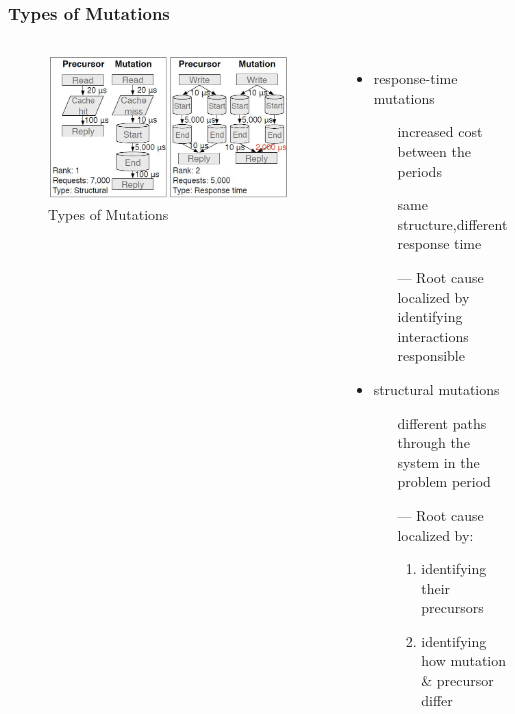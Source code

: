 \documentclass[11pt]{beamer}
\begin{document}
\begin{frame}
\frametitle{Types of Mutations}
\begin{columns}
\begin{figure}[htbp]
\centering
\includegraphics[width=.95\textwidth]{fig/mutation.jpg}
\caption{Types of Mutations}
\label{fig:mutation}
\end{figure}
\begin{itemize}
  \item response-time mutations
  \begin{itemize}
    \item[\ding{43}]increased cost between the periods
    \item[\ding{43}]same structure,different response time
    \vskip5pt
    \item[---] Root cause localized by
    identifying interactions responsible
  \end{itemize}
  \vskip10pt
  \item structural mutations
  \begin{itemize}
    \item[\ding{43}] different paths through the system in the problem period
    \vskip5pt
    \item[---]Root cause localized by:
    \begin{enumerate}
      \item identifying their precursors
      \item identifying how mutation \& precursor differ
    \end{enumerate}
  \end{itemize}
\end{itemize}
\end{columns}
\end{frame}
\end{document}
